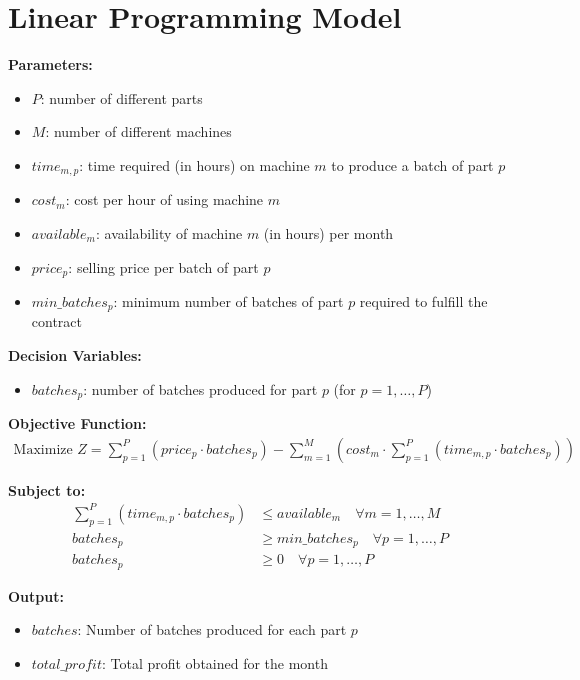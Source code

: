 \documentclass{article}
\begin{document}
\section*{Linear Programming Model}

\textbf{Parameters:}
\begin{itemize}
    \item $P$: number of different parts
    \item $M$: number of different machines
    \item $time_{m,p}$: time required (in hours) on machine $m$ to produce a batch of part $p$
    \item $cost_{m}$: cost per hour of using machine $m$
    \item $available_{m}$: availability of machine $m$ (in hours) per month
    \item $price_{p}$: selling price per batch of part $p$
    \item $min\_batches_{p}$: minimum number of batches of part $p$ required to fulfill the contract
\end{itemize}

\textbf{Decision Variables:}
\begin{itemize}
    \item $batches_{p}$: number of batches produced for part $p$ (for $p = 1, \ldots, P$)
\end{itemize}

\textbf{Objective Function:}
\begin{align*}
    \text{Maximize } Z = \sum_{p=1}^{P} (price_{p} \cdot batches_{p}) - \sum_{m=1}^{M} (cost_{m} \cdot \sum_{p=1}^{P} (time_{m,p} \cdot batches_{p}))
\end{align*}

\textbf{Subject to:}
\begin{align*}
    \sum_{p=1}^{P} (time_{m,p} \cdot batches_{p}) & \leq available_{m} \quad \forall m = 1, \ldots, M \\
    batches_{p} & \geq min\_batches_{p} \quad \forall p = 1, \ldots, P \\
    batches_{p} & \geq 0 \quad \forall p = 1, \ldots, P
\end{align*}

\textbf{Output:}
\begin{itemize}
    \item $batches$: Number of batches produced for each part $p$
    \item $total\_profit$: Total profit obtained for the month
\end{itemize}
\end{document}
